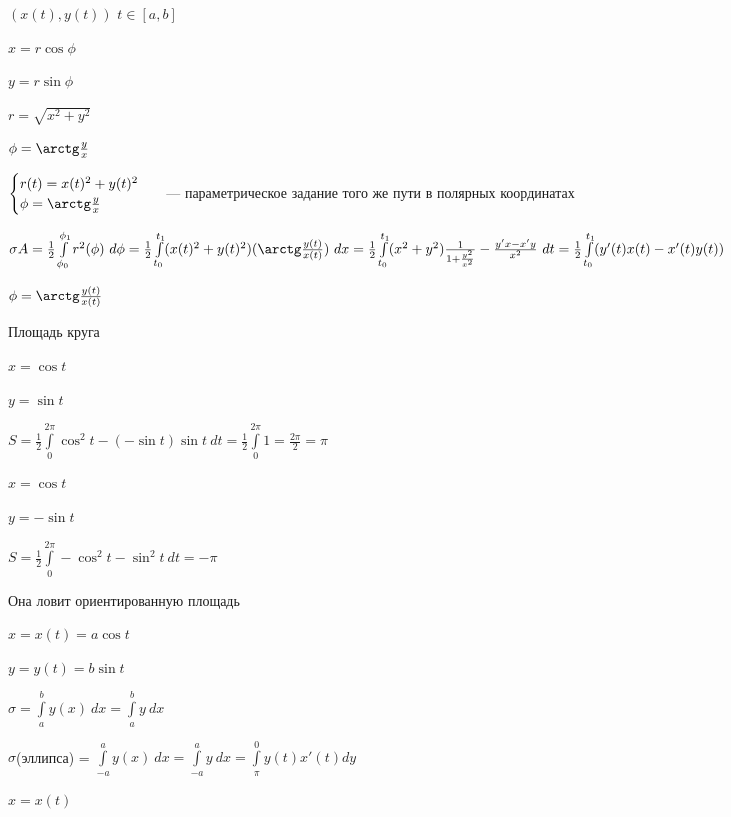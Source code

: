 \documentclass{article}
\begin{document}
            $(x(t), y(t))$ $t \in [a, b]$
            
            $x = r \cos \phi$
            
            $y = r \sin \phi$
            
            $r = \sqrt{x^2 + y^2}$
            
            $\phi = \arctg \frac{y}{x}$
            
            $\begin{cases} r(t) = x(t)^2 + y(t)^2 \\ \phi = \arctg \frac{y}{x} \end{cases}$ ~--- параметрическое задание того же пути в полярных координатах
            
            $\sigma A = \frac{1}{2} \int\limits^{\phi_1}_{\phi_0} r^2 (\phi) \ d \phi = \frac{1}{2} \int\limits^{t_1}_{t_0} (x(t)^2 + y(t)^2) (\arctg \frac{y(t)}{x(t)} ) \ dx = \frac{1}{2} \int\limits^{t_1}_{t_0} (x^2 + y^2) \frac{1}{1 + \frac{y^2}{x^2}} - \frac{y'x - x'y}{x^2} \ dt = \frac{1}{2} \int\limits^{t_1}_{t_0}(y'(t)x(t) - x'(t)y(t))$
            
            $\phi = \arctg \frac{y(t)}{x(t)}$
            
            Площадь круга
            
            $x = \cos t$
            
            $y = \sin t$
            
            $S = \frac{1}{2} \int\limits^{2\pi}_0 \cos^2 t - (-\sin t) \sin t \ dt = \frac{1}{2} \int\limits^{2\pi}_0 1 = \frac{2\pi}{2} = \pi$
            
            $x = \cos t$
            
            $y = -\sin t$
            
            $S = \frac{1}{2} \int\limits^{2\pi}_0 -\cos^2 t - \sin^2 t \ dt = - \pi$
            
            Она ловит ориентированную площадь
            
            $x = x(t) = a \cos t$
            
            $y = y(t) = b \sin t$
            
            $\sigma = \int\limits^b_a y(x) \ dx = \int\limits^b_a y \ dx$
            
            $\sigma$(эллипса) = $\int\limits^a_{-a} y(x) \ dx = \int\limits^a_{-a} y \ dx = \int\limits^0_{\pi} y(t) x'(t) dy$
            
            $x = x(t)$
            
\end{document}
